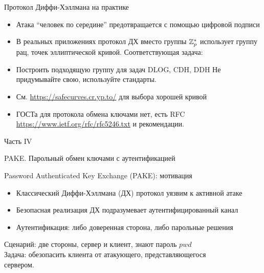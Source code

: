 \documentclass[usenames,dvipsnames,8pt,aspectratio=169]{beamer}
\begin{document}
\begin{frame}{Протокол Диффи-Хэллмана на практике}
\Large
\begin{itemize}
\itemsep 10pt
\item Атака ``человек по середине'' предотвращается с помощью цифровой подписи
\item В реальных приложениях протокол ДХ вместо группы ${{\mathbb Z}}_p^*$ использует группу рац, точек эллиптической кривой. Соответствующая задача:  {\color{Orange}{EDDH.}} 
\item Построить подходящую группу для задач DLOG, CDH, DDH {\color{Orange}{нетривиальна!}}  Не придумывайте свою, используйте стандарты.
\item См. \url{https://safecurves.cr.yp.to/} для выбора хорошей кривой
\item ГОСТа для протокола обмена ключами нет, есть RFC \url{https://www.ietf.org/rfc/rfc5246.txt} и рекомендации.
\end{itemize}

\end{frame}

\begin{frame}
Часть IV \\ [10pt]
\begin{LARGE}
	
	\color{Orange}
	\Huge  PAKE. Парольный обмен ключами с аутентификацией
	
\end{LARGE}
\end{frame}

\begin{frame}{Password Authenticated Key Exchange (PAKE): мотивация}
\Large
\begin{itemize}
	\itemsep 10pt
	\item Классический Диффи-Хэллмана (ДХ) протокол уязвим к активной атаке
	\item Безопасная реализация ДХ подразумевает аутентифицированный канал 
	\item Аутентификация:  либо { \color{Orange}доверенная сторона}, либо  {\color{Orange} парольные решения }
\end{itemize}

\vspace{20pt}

{\color{Orange} Сценарий}: две стороны, сервер и клиент, знают пароль $pwd$ \\[10pt]
{\color{Orange} Задача}: обезопасить клиента от атакующего, представляющегося \\ сервером. 
\end{frame}
\end{document}
